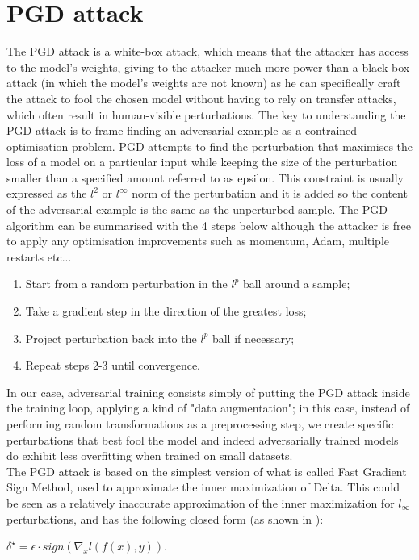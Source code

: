 \documentclass{article}
\begin{document}
\section{PGD attack}
The PGD attack is a white-box attack, which means that the attacker has access to the model's weights, giving to the attacker much more power than a black-box attack (in which the model's weights are not known) as he can specifically craft the attack to fool the chosen model without having to rely on transfer attacks, which often result in human-visible perturbations.
The key to understanding the PGD attack is to frame finding an adversarial example as a contrained optimisation problem. PGD attempts to find the perturbation that maximises the loss of a model on a particular input while keeping the size of the perturbation smaller than a specified amount referred to as epsilon. This constraint is usually expressed as the $l^2$ or $l^{\infty}$ norm of the perturbation and it is added so the content of the adversarial example is the same as the unperturbed sample.
The PGD algorithm can be summarised with the 4 steps below although the attacker is free to apply any optimisation improvements such as momentum, Adam, multiple restarts etc...
\begin{enumerate}
	\item Start from a random perturbation in the $l^p$ ball around a sample;
	\item Take a gradient step in the direction of the greatest loss;
	\item Project perturbation back into the $l^p$ ball if necessary;
	\item Repeat steps 2-3 until convergence.
\end{enumerate}
In our case, adversarial training consists simply of putting the PGD attack inside the training loop, applying a kind of "data augmentation"; in this case, instead of performing random transformations as a preprocessing step, we create specific perturbations that best fool the model and indeed adversarially trained models do exhibit less overfitting when trained on small datasets.\\
The PGD attack is based on the simplest version of what is called Fast Gradient Sign Method, used to approximate the inner maximization of Delta. This could be seen as a relatively inaccurate approximation of the inner maximization for $l_{\infty}$ perturbations, and has the following closed form (as shown in \cite{GoodfellowEtAl2014}):
\begin{center}
	$\delta^{\star} = \epsilon \cdot sign(\nabla_{x}l(f(x), y))$.
\end{center}
\end{document}
